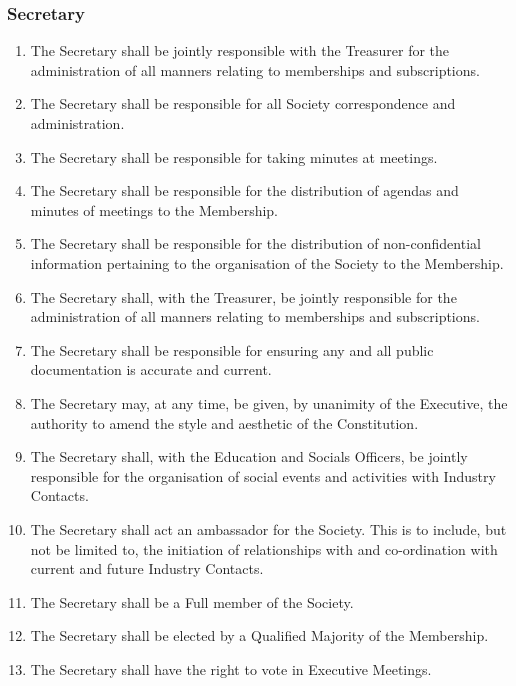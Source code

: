 \documentclass{scrartcl}
\begin{document}
            \subsubsection{Secretary}
                \label{executive--positions--secretary}
                \begin{enumerate}
                    \item The Secretary shall be jointly responsible with the Treasurer for the administration of all manners relating to memberships and subscriptions.
                    \item The Secretary shall be responsible for all Society correspondence and administration.
                    \item The Secretary shall be responsible for taking minutes at meetings.
                    \item The Secretary shall be responsible for the distribution of agendas and minutes of meetings to the Membership.
                    \item The Secretary shall be responsible for the distribution of non-confidential information pertaining to the organisation of the Society to the Membership.
                    \item The Secretary shall, with the Treasurer, be jointly responsible for the administration of all manners relating to memberships and subscriptions.
                    \item The Secretary shall be responsible for ensuring any and all public documentation is accurate and current.
                    \item The Secretary may, at any time, be given, by unanimity of the Executive, the authority to amend the style and aesthetic of the Constitution.
                    \item The Secretary shall, with the Education and Socials Officers, be jointly responsible for the organisation of social events and activities with Industry Contacts.
                    \item The Secretary shall act an ambassador for the Society. This is to include, but not be limited to, the initiation of relationships with and co-ordination with current and future Industry Contacts.
                    \item The Secretary shall be a Full member of the Society.
                    \item The Secretary shall be elected by a Qualified Majority of the Membership.
                    \item The Secretary shall have the right to vote in Executive Meetings.
                \end{enumerate}
\end{document}
